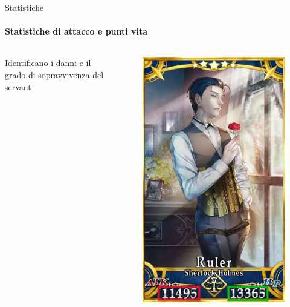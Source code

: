 \documentclass{beamer}
\begin{document}
\begin{darkframes}
  \begin{frame}{Statistiche}
    \framesubtitle{Statistiche di attacco e punti vita}
    \begin{columns}
      \begin{column}{0.5\textwidth}
        Identificano i danni e il grado di sopravvivenza del servant
      \end{column}
      \begin{column}{0.5\textwidth}
        \begin{figure}
          \centering
          \includegraphics[height=0.65\textheight]{./images/servant_atk_hp.png}
        \end{figure}
      \end{column}
    \end{columns}
  \end{frame}


\end{darkframes}
\end{document}
